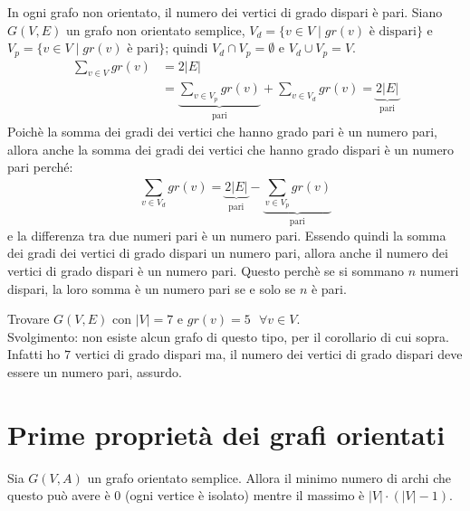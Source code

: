 \begin{cor}
    In ogni grafo non orientato, il numero dei vertici di grado dispari è pari.
\proof
    Siano $G(V,E)$ un grafo non orientato semplice, ${V_d = \{v \in V \mid gr(v) \text{ è dispari}\}}$ e
    ${V_p = \{v \in V \mid gr(v) \text{ è pari}\}}$; quindi ${V_d \cap V_p = \emptyset}$ e 
    ${V_d \cup V_p = V}$.
    \begin{equation*}
    \begin{split}
        \sum_{v \in V}^{} gr(v) & = 
        2|E| \\ & = 
        \underbrace{{\sum_{v \in V_p}^{} gr(v)}}_{\text{pari}} + {\sum_{v \in V_d}^{} gr(v)} = 
        \underbrace{2|E|}_{\text{pari}}
    \end{split}
    \end{equation*}
    Poichè la somma dei gradi dei vertici che hanno grado pari è un numero pari, 
    allora anche la somma dei gradi dei vertici che hanno grado dispari è un numero pari perché:
    \[
        {\sum_{v \in V_d}^{} gr(v)} = \underbrace{2|E|}_{\text{pari}} - 
                \underbrace{{\sum_{v \in V_p}^{} gr(v)}}_{\text{pari}}
    \]
    e la differenza tra due numeri pari è un numero pari. Essendo quindi la somma dei gradi dei vertici
    di grado dispari un numero pari, allora anche il numero dei vertici di grado dispari è un numero
    pari. Questo perchè se si sommano $n$ numeri dispari, la loro somma è un numero pari 
    se e solo se $n$ è pari.
\endproof
\end{cor}

\begin{eser}
    Trovare $G(V,E)$ con $|V| = 7$ e ${gr(v) = 5 \text{ } \forall v \in V}$.\\
    Svolgimento: non esiste alcun grafo di questo tipo, per il corollario di cui sopra.
    Infatti ho $7$ vertici di grado dispari ma, il numero dei vertici di grado dispari
    deve essere un numero pari, assurdo.%
\end{eser}




\section{Prime proprietà dei grafi orientati}
Sia $G(V,A)$ un grafo orientato semplice. Allora il minimo numero di archi che questo può
avere è $0$ (ogni vertice è isolato) mentre il massimo è ${|V| \cdot (|V|-1)}$.

